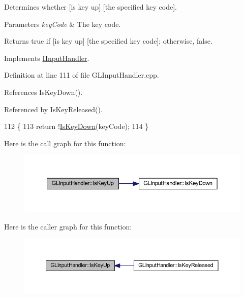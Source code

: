 Determines whether \mbox{[}is key up\mbox{]} \mbox{[}the specified key code\mbox{]}. 


\begin{DoxyParams}{Parameters}
{\em key\+Code} & The key code.\\
\hline
\end{DoxyParams}
\begin{DoxyReturn}{Returns}
{\ttfamily true} if \mbox{[}is key up\mbox{]} \mbox{[}the specified key code\mbox{]}; otherwise, {\ttfamily false}. 
\end{DoxyReturn}


Implements \hyperlink{class_i_input_handler_a234ffb504b1f22407ccf10964585b6be}{I\+Input\+Handler}.



Definition at line 111 of file G\+L\+Input\+Handler.\+cpp.



References Is\+Key\+Down().



Referenced by Is\+Key\+Released().


\begin{DoxyCode}
112 \{
113   \textcolor{keywordflow}{return} !\hyperlink{class_g_l_input_handler_ad6598623bbf7506111da24fd2bc6b9fe}{IsKeyDown}(keyCode);
114 \}
\end{DoxyCode}


Here is the call graph for this function\+:\nopagebreak
\begin{figure}[H]
\begin{center}
\leavevmode
\includegraphics[width=350pt]{class_g_l_input_handler_a3a1dbf9463118c74302228e02dfb0cbf_cgraph}
\end{center}
\end{figure}




Here is the caller graph for this function\+:\nopagebreak
\begin{figure}[H]
\begin{center}
\leavevmode
\includegraphics[width=350pt]{class_g_l_input_handler_a3a1dbf9463118c74302228e02dfb0cbf_icgraph}
\end{center}
\end{figure}



